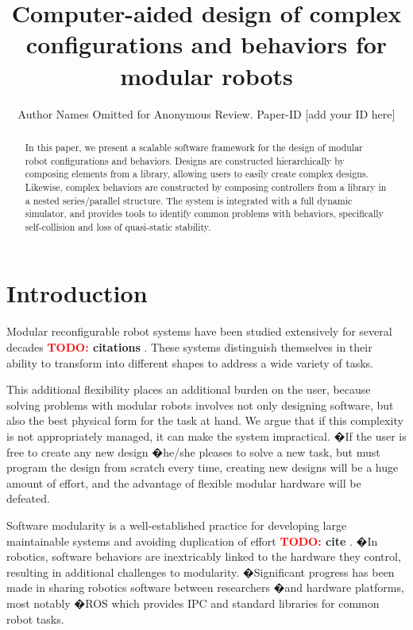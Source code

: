 \documentclass[conference]{IEEEtran}
\theoremstyle{definition}
\newcommand{\TODO}[1]{ {\bf \textcolor{red}{TODO:} #1 }}
\begin{document}
\title{Computer-aided design of complex configurations and behaviors for modular robots}

\author{Author Names Omitted for Anonymous Review. Paper-ID [add your ID here]}

\maketitle

\begin{abstract}
In this paper, we present a scalable software framework for the design of modular robot configurations and behaviors. Designs are constructed hierarchically by composing elements from a library, allowing users to easily create complex designs.  Likewise, complex behaviors are constructed by composing controllers from a library in a nested series/parallel structure. The system is integrated with a full dynamic simulator, and provides tools to identify common problems with behaviors, specifically self-collision and loss of quasi-static stability.

\end{abstract}

\section{Introduction}
Modular reconfigurable robot systems have been studied extensively for several decades \TODO{citations}.  These systems distinguish themselves in their ability to transform into different shapes to address a wide variety of tasks.

This additional flexibility places an additional burden on the user, because solving problems with modular robots involves not only designing  software,
but also the best physical form for the task at hand. We argue that if this
complexity is not appropriately managed, it can make the system
impractical. �If the user is free to create any new design �he/she pleases to
solve a new task, but must program the design from scratch every time, creating
new designs will be a huge amount of effort, and the advantage of flexible modular
hardware will be defeated.

Software modularity is a well-established practice for developing large
maintainable systems and avoiding duplication of effort \TODO{cite}. �In robotics, software
behaviors are inextricably linked to the hardware they control, resulting in
additional challenges to modularity. �Significant progress has been made in
sharing robotics software between researchers
�and hardware platforms, most notably
�ROS which provides IPC and standard libraries for common robot tasks. 
\end{document}
